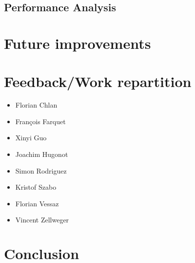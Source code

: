 \documentclass{article}
\begin{document}
\subsection{Performance Analysis}

\section{Future improvements} %

\section{Feedback/Work repartition} %
\begin{itemize}
\item Florian Chlan
\item François Farquet
\item Xinyi Guo
\item Joachim Hugonot
\item Simon Rodriguez
\item Kristof Szabo
\item Florian Vessaz
\item Vincent Zellweger
\end{itemize}
\section{Conclusion}
\end{document}
